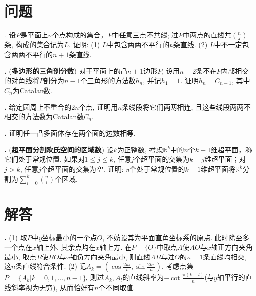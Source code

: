 
\section*{问题}


\par \textbf{\theprobdisgeo .} \cite{MaP} 设$P$是平面上$n$个点构成的集合，$P$中任意三点不共线; 过$P$中两点的直线共$\binom{n}{2}$条, 构成的集合记为$L$. 证明: (1) $L$中包含两两不平行的$n$条直线. (2) $L$中不一定包含两两不平行的$n+1$条直线.

\par \textbf{\theprobdisgeo .} (\textbf{多边形的三角剖分数}) 对于平面上的凸$n+1$边形$P$, 设用$n-2$条不在$P$内部相交的对角线将$P$剖分为$n-1$个三角形的方法数$h_n$, 并记$h_1=1$. 证明$h_n=C_{n-1}$, 其中$C_n$为Catalan数.

\par \textbf{\theprobdisgeo .} \cite{IC} 给定圆周上不重合的$2n$个点, 证明用$n$条线段将它们两两相连, 且这些线段两两不相交的方法数为Catalan数$C_n$. 

\par \textbf{\theprobdisgeo .} \cite{MaP} 证明任一凸多面体存在两个面的边数相等. 

\par \textbf{\theprobdisgeo .} (\textbf{超平面分割欧氏空间的区域数}) 设$k$为正整数, 考虑$\mathbb{R}^k$中的$n$个$k-1$维超平面，称它们处于常规位置, 如果对$1\le j\le k$, 任意$j$个超平面的交集为$k-j$维超平面；对$j>k$, 任意$j$个超平面的交集为空. 证明: $n$个处于常规位置的$k-1$维超平面将$\mathbb{R}^k$分割为$\sum_{i=0}^k \binom{n}{i}$个区域. 


\section*{解答}


\par \textbf{\thesoldisgeo .} \cite{MaP} (1) 取$P$中$y$坐标最小的一个点$O$, 不妨设其为平面直角坐标系的原点. 此时除至多一个点在$x$轴上外, 其余点均在$x$轴上方. 在$P-\{O\}$中取点$A$使$AO$与$x$轴正方向夹角最小, 取点$B$使$BO$与$x$轴负方向夹角最小, 则直线$AB$与过$O$的$n-1$条直线均相交, 这$n$条直线符合条件. (2) 记$A_k = (\cos \frac{2k\pi}{n}, \sin \frac{2k\pi}{n})$, 考虑点集$P=\{A_k \vert k=0,1,\dots,n-1\}$, 则过$A_k, A_l$的直线斜率为$-\cot \frac{\pi(k+l)}{n}$(与$y$轴平行的直线斜率视为无穷), 从而恰好有$n$个不同取值. 

